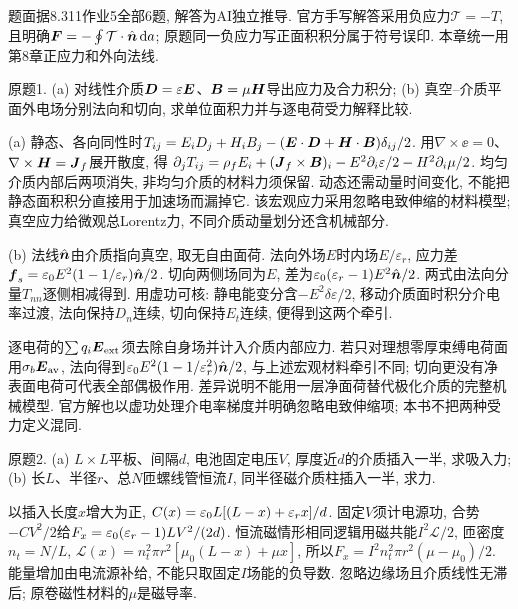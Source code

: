 题面据8.311作业5全部6题, 解答为AI独立推导. 官方手写解答采用负应力$\mathcal T=-T$, 且明确$\boldsymbol{F}=-\oint\mathcal T\cdot\hat{\boldsymbol{n}}\,\mathrm d a$; 原题同一负应力写正面积积分属于符号误印. 本章统一用第8章正应力和外向法线.
\begin{exercise}
原题1. (a) 对线性介质$\boldsymbol{D}=\varepsilon\boldsymbol{E}$、$\boldsymbol{B}=\mu\boldsymbol{H}$导出应力及合力积分; (b) 真空–介质平面外电场分别法向和切向, 求单位面积力并与逐电荷受力解释比较.
\end{exercise}
\begin{solution}
(a) 静态、各向同性时$T_{ij}=E_iD_j+H_iB_j-(\boldsymbol{E}\cdot\boldsymbol{D}+\boldsymbol{H}\cdot\boldsymbol{B})\delta_{ij}/2$. 用$\nabla\times\ee=0$、$\nabla\times\boldsymbol{H}=\boldsymbol{J}_f$展开散度, 得
$\partial_jT_{ij}=\rho_fE_i+(\boldsymbol{J}_f\times\boldsymbol{B})_i-E^2\partial_i\varepsilon/2-H^2\partial_i\mu/2$. 均匀介质内部后两项消失, 非均匀介质的材料力须保留. 动态还需动量时间变化, 不能把静态面积积分直接用于加速场而漏掉它. 该宏观应力采用忽略电致伸缩的材料模型; 真空应力给微观总Lorentz力, 不同介质动量划分还含机械部分.

(b) 法线$\hat{\boldsymbol{n}}$由介质指向真空, 取无自由面荷. 法向外场$E$时内场$E/\varepsilon_r$, 应力差$\boldsymbol{f}_s=\varepsilon_0 E^2(1-1/\varepsilon_r)\hat{\boldsymbol{n}}/2$. 切向两侧场同为$E$, 差为$\varepsilon_0(\varepsilon_r-1)E^2\hat{\boldsymbol{n}}/2$. 两式由法向分量$T_{nn}$逐侧相减得到. 用虚功可核: 静电能变分含$-E^2\delta\varepsilon/2$, 移动介质面时积分介电率过渡, 法向保持$D_n$连续, 切向保持$E_t$连续, 便得到这两个牵引.

逐电荷的$\sum q_i\boldsymbol{E}_{\rm ext}$须去除自身场并计入介质内部应力. 若只对理想零厚束缚电荷面用$\sigma_b\boldsymbol{E}_{\rm av}$, 法向得到$\varepsilon_0 E^2(1-1/\varepsilon_r^2)\hat{\boldsymbol{n}}/2$, 与上述宏观材料牵引不同; 切向更没有净表面电荷可代表全部偶极作用. 差异说明不能用一层净面荷替代极化介质的完整机械模型. 官方解也以虚功处理介电率梯度并明确忽略电致伸缩项; 本书不把两种受力定义混同.
\end{solution}
\begin{exercise}
原题2. (a) $L\times L$平板、间隔$d$, 电池固定电压$V$, 厚度近$d$的介质插入一半, 求吸入力; (b) 长$L$、半径$r$、总$N$匝螺线管恒流$I$, 同半径磁介质柱插入一半, 求力.
\end{exercise}
\begin{solution}
以插入长度$x$增大为正, $C(x)=\varepsilon_0 L[(L-x)+\varepsilon_rx]/d$. 固定$V$须计电源功, 合势$-CV^2/2$给$F_x=\varepsilon_0(\varepsilon_r-1)LV^2/(2d)$. 恒流磁情形相同逻辑用磁共能$I^2\mathcal L/2$, 匝密度$n_t=N/L$, $\mathcal L(x)=n_t^2\pi r^2[\mu_0(L-x)+\mu x]$, 所以$F_x=I^2n_t^2\pi r^2(\mu-\mu_0)/2$. 能量增加由电流源补给, 不能只取固定$I$场能的负导数. 忽略边缘场且介质线性无滞后; 原卷磁性材料的$\mu$是磁导率.
\end{solution}

